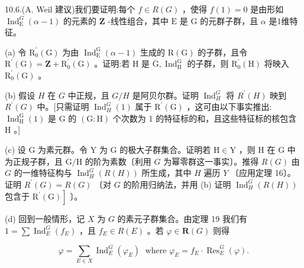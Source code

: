 \documentclass[10pt]{article}
\begin{document}
10.6.(A. Weil 建议)我们要证明:每个 \(f \in  R\left( G\right)\) ，使得 \(f\left( 1\right)  = 0\) 是由形如 \({\operatorname{Ind}}_{\mathrm{E}}^{G}\left( {\alpha  - 1}\right)\) 的元素的 \(\mathbf{Z}\) -线性组合，其中 \(\mathrm{E}\) 是 \(\mathrm{G}\) 的元群子群，且 \(\alpha\) 是1维特征。

(a) 令 \({\mathrm{R}}_{0}^{\prime }\left( \mathrm{G}\right)\) 为由 \({\operatorname{Ind}}_{\mathrm{E}}^{\mathrm{G}}\left( {\alpha  - 1}\right)\) 生成的 \(\mathrm{R}\left( \mathrm{G}\right)\) 的子群，且令 \({\mathrm{R}}^{\prime }\left( \mathrm{G}\right)  = \mathbf{Z} + {\mathrm{R}}_{0}^{\prime }\left( \mathrm{G}\right)\) 。证明:若 \(\mathrm{H}\) 是 \(\overline{\mathrm{G}},{\operatorname{Ind}}_{\mathrm{H}}^{\mathrm{G}}\) 的子群，则 \({\mathrm{R}}_{0}^{\prime }\left( \mathrm{H}\right)\) 将映入 \({\mathrm{R}}_{0}^{\prime }\left( \mathrm{G}\right)\) 。

(b) 假设 \(H\) 在 \(G\) 中正规，且 \(G/H\) 是阿贝尔群。证明 \({\operatorname{Ind}}_{H}^{G}\) 将 \({R}^{\prime }\left( H\right)\) 映到 \({R}^{\prime }\left( G\right)\) 中。[只需证明 \({\operatorname{Ind}}_{H}^{G}\left( 1\right)\) 属于 \({\mathrm{R}}^{\prime }\left( \mathrm{G}\right)\) ，这可由以下事实推出: \({\operatorname{Ind}}_{\mathrm{H}}^{\mathrm{G}}\left( 1\right)\) 是 \(\mathrm{G}\) 的 \(\left( {\mathrm{G} : \mathrm{H}}\right)\) 个次数为 1 的特征标的和，且这些特征标的核包含 \(\mathrm{H}\) 。]

(c) 设 \(\mathrm{G}\) 为素元群。令 \(\mathrm{Y}\) 为 \(\mathrm{G}\) 的极大子群集合。证明若 \(\mathrm{H} \in  \mathrm{Y}\) ，则 \(\mathrm{H}\) 在 \(\mathrm{G}\) 中为正规子群，且 \(\mathrm{G}/\mathrm{H}\) 的阶为素数〔利用 \(G\) 为幂零群这一事实〕。推得 \(R\left( G\right)\) 由 \(G\) 的一维特征构与 \({\operatorname{Ind}}_{H}^{G}\left( {R\left( H\right) }\right)\) 所生成，其中 \(H\) 遍历 \(Y\) 〔应用定理 16〕。证明 \({R}^{\prime }\left( G\right)  = R\left( G\right)\) 〔对 \(G\) 的阶用归纳法，并用 (b) 证明 \({\operatorname{Ind}}_{H}^{G}\left( {R\left( H\right) }\right)\) 包含于 \(\left. {{\mathrm{R}}^{\prime }\left( \mathrm{G}\right) }\right\rbrack\) 〕。

(d) 回到一般情形，记 \(X\) 为 \(G\) 的素元子群集合。由定理 19 我们有 \(1 = \sum {\operatorname{Ind}}_{E}^{G}\left( {f}_{E}\right)\) ，且 \({f}_{E} \in  R\left( E\right)\) 。若 \(\varphi  \in  \mathbf{R}\left( G\right)\) 则得

\[
\varphi  = \mathop{\sum }\limits_{{E \in  X}}{\operatorname{Ind}}_{E}^{G}\left( {\varphi }_{E}\right) \;\text{ where }{\varphi }_{E} = {f}_{E} \cdot  {\operatorname{Res}}_{E}^{G}\left( \varphi \right) .
\]
\end{document}
